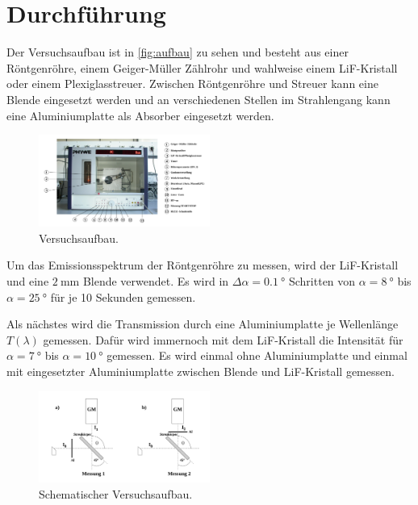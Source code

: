 \newpage
\section{Durchführung}
\label{sec:Durchführung}


Der Versuchsaufbau ist in \autoref{fig:aufbau} zu sehen und besteht aus einer Röntgenröhre, einem Geiger-Müller Zählrohr und wahlweise einem LiF-Kristall oder einem Plexiglasstreuer.
Zwischen Röntgenröhre und Streuer kann eine Blende eingesetzt werden und an verschiedenen Stellen im Strahlengang kann eine Aluminiumplatte als Absorber eingesetzt werden.

\begin{figure}
    \centering
    \includegraphics[width=0.5\textwidth]{images/bild_3.png}
    \caption{Versuchsaufbau.\cite{V603}}
    \label{fig:aufbau}
\end{figure}

Um das Emissionsspektrum der Röntgenröhre zu messen, wird der LiF-Kristall und eine $\SI{2}{\milli\metre}$ Blende verwendet.
Es wird in $\Delta \alpha = \SI{0.1}{\degree}$ Schritten von $\alpha=\SI{8}{\degree}$ bis $\alpha = \SI{25}{\degree}$ für je 10 Sekunden gemessen.

\FloatBarrier

Als nächstes wird die Transmission durch eine Aluminiumplatte je Wellenlänge $T(\lambda)$ gemessen.
Dafür wird immernoch mit dem LiF-Kristall die Intensität für $\alpha = \SI{7}{\degree}$ bis $\alpha = \SI{10}{\degree}$ gemessen.
Es wird einmal ohne Aluminiumplatte und einmal mit eingesetzter Aluminiumplatte zwischen Blende und LiF-Kristall gemessen.

\begin{figure}
    \centering
    \includegraphics[width=0.5\textwidth]{images/bild_4.png}
    \caption{Schematischer Versuchsaufbau.\cite{V603}}
    \label{fig:schema}
\end{figure}

